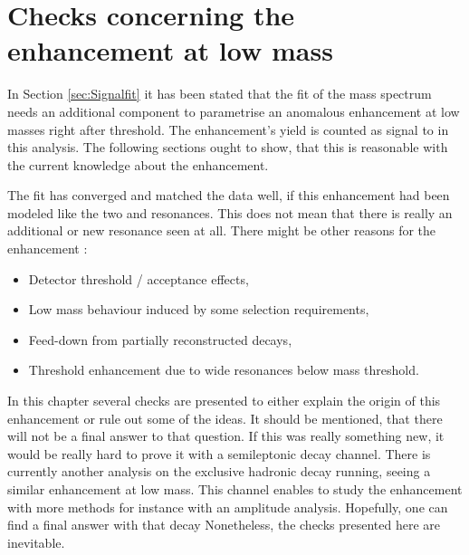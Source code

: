 \chapter{Checks concerning the enhancement at low \Dz\proton mass}
\label{sec:Structure}
In Section \ref{sec:Signalfit} it has been stated that the fit of the \Dz\proton mass spectrum needs an additional component to parametrise an anomalous enhancement at low \Dz\proton masses right after threshold.
The enhancement's yield is counted as signal to \NDp in this analysis.
The following sections ought to show, that this is reasonable with the current knowledge about the enhancement.

The fit has converged and matched the data well, if this enhancement had been modeled like the two \LcResI and \LcResII resonances.
This does not mean that there is really an additional or new resonance seen at all.
There might be other reasons for the enhancement :
\begin{itemize}
    \item Detector threshold / acceptance effects,
    \item Low mass behaviour induced by some selection requirements,
    \item Feed-down from partially reconstructed decays,
    \item Threshold enhancement due to wide resonances below \Dz\proton mass threshold.
\end{itemize}
In this chapter several checks are presented to either explain the origin of this enhancement or rule out some of the ideas.
It should be mentioned, that there will not be a final answer to that question.
If this was really something new, it would be really hard to prove it with a semileptonic decay channel.
There is currently another \lhcb analysis on the exclusive hadronic decay \decay{\Lb}{\Dz\proton\pim} running, seeing a similar enhancement at low \Dz\proton mass.
This channel enables to study the enhancement with more methods for instance with an amplitude analysis. 
Hopefully, one can find a final answer with that decay
Nonetheless, the checks presented here are inevitable.

